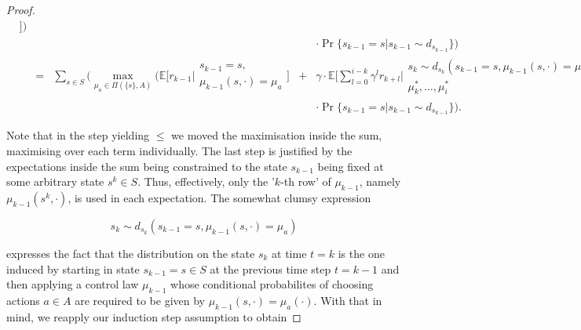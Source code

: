 \documentclass[11pt]{article} %
\begin{document}
\begin{proof}
\begin{equation}
\begin{array}{rrccl}
\begin{array}{c}
																																															\end{array} \Big] \Big) \\
		&		&		& 	& \cdot  \Pr\{ s_{k-1} = s | s_{k-1} \sim d_{s_{k-1}} \} \Big) \\
		& = 	&	\sum\limits_{s \in S}^{} \Big( \max\limits_{\mu_a \in \Pi(\{s\},A)} \Big( \mathbb{E}\Big[ r_{k-1} \Big| \begin{array}{c}
																						s_{k-1} = s, \\
																						\mu_{k-1}(s,\cdot) = \mu_a
																					\end{array} \Big]  & + & \gamma  \cdot \mathbb{E} \Big[ \sum\limits_{l=0}^{i-k} \gamma^l r_{k+l} \Big| \begin{array}{c}
																																																s_k \sim d_{s_k}(s_{k-1} = s,\mu_{k-1}(s,\cdot) = \mu_a), \\
																																																\mu_k^*,\dots,\mu_i^*
																																															\end{array} \Big] \Big) \\
		&		&		& 	& \cdot  \Pr\{ s_{k-1} = s | s_{k-1} \sim d_{s_{k-1}} \} \Big).
	\end{array}
\end{equation}

Note that in the step yielding $\le$ we moved the maximisation inside the sum, maximising over each term individually. The last step is justified by the expectations inside the sum being constrained to the state $s_{k-1}$ being fixed at some arbitrary state $s^k \in S$. Thus, effectively, only the '$k$-th row' of $\mu_{k-1}$, namely $\mu_{k-1}(s^k,\cdot)$, is used in each expectation. The somewhat clumsy expression

\begin{equation}
	s_k \sim d_{s_k}(s_{k-1} = s,\mu_{k-1}(s,\cdot) = \mu_a)
\end{equation}

expresses the fact that the distribution on the state $s_k$ at time $t = k$ is the one induced by starting in state $s_{k-1} = s \in S$ at the previous time step $t = k-1$ and then applying a control law $\mu_{k-1}$ whose conditional probabilites of choosing actions $a \in A$ are required to be given by $\mu_{k-1}(s,\cdot) = \mu_a(\cdot)$. With that in mind, we reapply our induction step assumption to obtain


\end{proof}
\end{document}
